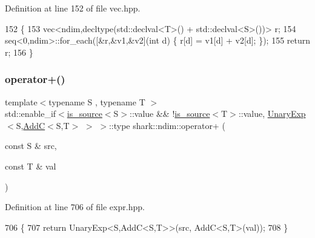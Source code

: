 Definition at line 152 of file vec.\+hpp.


\begin{DoxyCode}
152                                                                                                            
                        \{
153             vec<ndim,decltype(std::declval<T>() + std::declval<S>())> r;
154             seq<0,ndim>::for\_each([&r,&v1,&v2](\textcolor{keywordtype}{int} d) \{ r[d] = v1[d] + v2[d]; \});
155             \textcolor{keywordflow}{return} r;
156         \}
\end{DoxyCode}
\hypertarget{namespaceshark_1_1ndim_a63fa4086ee305e74456f6f5ec122f0e7}{}\label{namespaceshark_1_1ndim_a63fa4086ee305e74456f6f5ec122f0e7} 
\subsubsection{\texorpdfstring{operator+()}{operator+()}\hspace{0.1cm}{\footnotesize\ttfamily [3/5]}}
{\footnotesize\ttfamily template$<$typename S , typename T $>$ \\
std\+::enable\+\_\+if$<$\hyperlink{classshark_1_1ndim_1_1is__source}{is\+\_\+source}$<$S$>$\+::value \&\& !\hyperlink{classshark_1_1ndim_1_1is__source}{is\+\_\+source}$<$T$>$\+::value, \hyperlink{classshark_1_1ndim_1_1_unary_exp}{Unary\+Exp}$<$S,\hyperlink{classshark_1_1ndim_1_1_add_c}{AddC}$<$S,T$>$ $>$ $>$\+::type shark\+::ndim\+::operator+ (\begin{DoxyParamCaption}\item[{const S \&}]{src,  }\item[{const T \&}]{val }\end{DoxyParamCaption})}



Definition at line 706 of file expr.\+hpp.


\begin{DoxyCode}
706                                                                                                            
                                   \{
707             \textcolor{keywordflow}{return} UnaryExp<S,AddC<S,T>>(src, AddC<S,T>(val));
708         \}
\end{DoxyCode}
\hypertarget{namespaceshark_1_1ndim_ab911025a5c581955f4802f0f2a46b9b0}{}\label{namespaceshark_1_1ndim_ab911025a5c581955f4802f0f2a46b9b0} 
